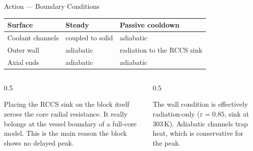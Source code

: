 \documentclass[aspectratio=169, 11pt, t]{beamer}
\begin{document}
\begin{frame}{Action --- Boundary Conditions}
\vspace{2pt}

{\small\renewcommand{\arraystretch}{1.35}
\begin{tabular}{@{}p{3.0cm} p{4.3cm} p{4.7cm}@{}}
\toprule
\textbf{Surface} & \textbf{Steady} & \textbf{Passive cooldown}\\
\midrule
Coolant channels & coupled to solid & adiabatic\\
Outer wall & adiabatic & radiation to the RCCS sink\\
Axial ends & adiabatic & adiabatic\\
\bottomrule
\end{tabular}}
\vspace{12pt}

\begin{columns}[T]
\begin{column}{0.5\textwidth}
\begin{tcolorbox}[hotbox]
\footnotesize Placing the RCCS sink on the block itself zeroes the core radial resistance. It really belongs at the vessel boundary of a full-core model. This is the main reason the block shows no delayed peak.
\end{tcolorbox}
\end{column}
\begin{column}{0.5\textwidth}
\begin{tcolorbox}[tealbox]
\footnotesize The wall condition is effectively radiation-only ($\varepsilon = 0.85$, sink at 303\,K). Adiabatic channels trap heat, which is conservative for the peak.
\end{tcolorbox}
\end{column}
\end{columns}
\end{frame}
\end{document}
